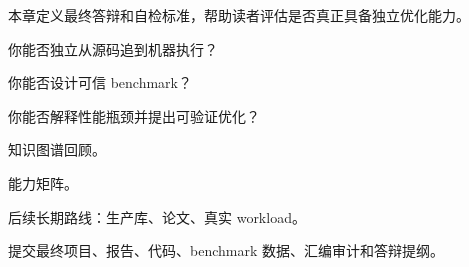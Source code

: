 {本章定义最终答辩和自检标准，帮助读者评估是否真正具备独立优化能力。}
{\item 你能否独立从源码追到机器执行？
\item 你能否设计可信 benchmark？
\item 你能否解释性能瓶颈并提出可验证优化？}
{\item 知识图谱回顾。
\item 能力矩阵。
\item 后续长期路线：生产库、论文、真实 workload。}
{提交最终项目、报告、代码、benchmark 数据、汇编审计和答辩提纲。}
